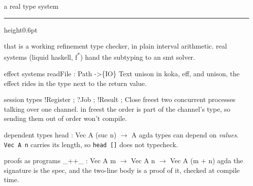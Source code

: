 
  \begin{frame}[t]{a real type system}
    \paperheight
    \paperheight
    {\color{cwRule}\hrule height0.6pt}\vskip10pt
    {\cwhankenbody\color{cwFaint}\small that is a working refinement type checker, in plain interval arithmetic. real systems (liquid haskell, f\textsuperscript{*}) hand the subtyping to an smt solver.}
  \end{frame}

  \begin{frame}{effect systems}
      {readFile : Path ->\{IO\} Text}
      {unison}
      {in koka, eff, and unison, the effect rides in the type next to the return value.}
  \end{frame}

  \begin{frame}{session types}
      {!Register ; ?Job ; !Result ; Close}
      {freest}
      {two concurrent processes talking over one channel. in freest the order is part of the channel's type, so sending them out of order won't compile.}
  \end{frame}

  \begin{frame}{dependent types}
      {head : Vec A (suc n) $\to$ A}
      {agda}
      {types can depend on \emph{values}. \texttt{Vec A n} carries its length,
       so \texttt{head []} does not typecheck.}
  \end{frame}

  \begin{frame}{proofs as programs}
      {\_++\_ : Vec A m $\to$ Vec A n $\to$ Vec A (m + n)}
      {agda}
      {the signature is the spec, and the two-line body is a proof of it,
       checked at compile time.}
  \end{frame}

